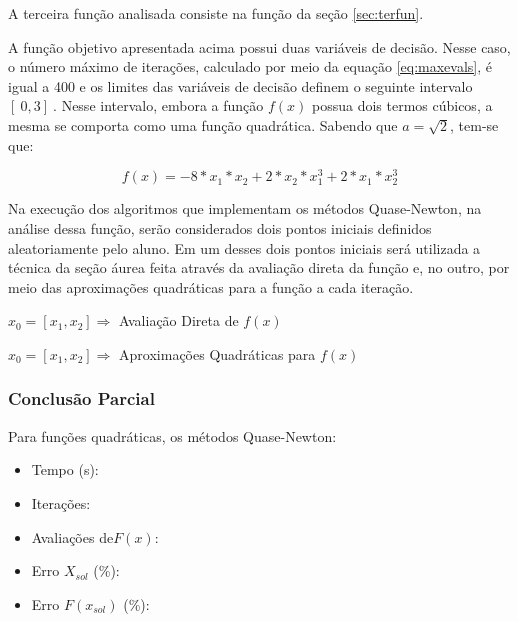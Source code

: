     A terceira função analisada consiste na função da seção \ref{sec:terfun}.
    
    A função objetivo apresentada acima possui duas variáveis de decisão. Nesse caso, o número máximo de iterações, calculado por meio da equação \ref{eq:maxevals}, é igual a 400 e os limites das variáveis de decisão definem o seguinte intervalo $[\ 0 , 3 ]\ $. Nesse intervalo, embora a função $f(x)$ possua dois termos cúbicos, a mesma se comporta como uma função quadrática. Sabendo que $a=\sqrt{2}$, tem-se que:

    \begin{equation*} 
        f(x) = -8*x_1*x_2+2*x_2*x_1^3+2*x_1*x_2^3
    \end{equation*}

    Na execução dos algoritmos que implementam os métodos Quase-Newton, na análise dessa função, serão considerados dois pontos iniciais definidos aleatoriamente pelo aluno. Em um desses dois pontos iniciais será utilizada a técnica da seção áurea feita através da avaliação direta da função e, no outro, por meio das aproximações quadráticas para a função a cada iteração.

        \begin{minipage}{\linewidth}
            \centering
            $x_0=[x_1,x_2]\Longrightarrow$  Avaliação Direta de $f(x)$
            \label{tab:tblg} 
            \writetable{\tblg}
            \bigskip
        \end{minipage}
        
        \begin{minipage}{\linewidth}
            \centering
            $x_0=[x_1,x_2]\Longrightarrow$  Aproximações Quadráticas para $f(x)$
            \label{tab:tblh} 
            \writetable{\tblh}
            \bigskip
        \end{minipage}

        \subsubsection{Conclusão Parcial}
            Para funções quadráticas, os métodos Quase-Newton:
            \begin{itemize}
            \item {Tempo (s):} 
            \item {Iterações:} 
            \item {Avaliações de$F(x)$:} 
            \item {Erro $X_{sol}$ (\%):} 
            \item {Erro $F(x_{sol})$ (\%):} 
            \end{itemize}
\newpage